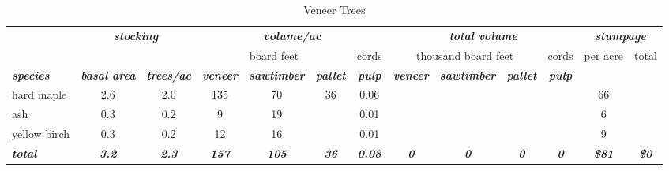 \documentclass[landscape]{article}
\begin{document}
\begin{table}[H]

\caption{\label{tab:unnamed-chunk-11}Veneer Trees}
\fontsize{10}{12}\selectfont
\begin{tabular}[t]{lcccccccccccc}
\toprule
\multicolumn{1}{c}{\em{\textbf{ }}} & \multicolumn{2}{c}{\em{\textbf{stocking}}} & \multicolumn{4}{c}{\em{\textbf{volume/ac }}} & \multicolumn{4}{c}{\em{\textbf{total volume}}} & \multicolumn{2}{c}{\em{\textbf{stumpage}}} \\
\cmidrule(l{3pt}r{3pt}){2-3} \cmidrule(l{3pt}r{3pt}){4-7} \cmidrule(l{3pt}r{3pt}){8-11} \cmidrule(l{3pt}r{3pt}){12-13}
\multicolumn{3}{c}{ } & \multicolumn{3}{c}{board feet} & \multicolumn{1}{c}{cords} & \multicolumn{3}{c}{thousand board feet} & \multicolumn{1}{c}{cords} & \multicolumn{1}{c}{per acre} & \multicolumn{1}{c}{total} \\
\cmidrule(l{3pt}r{3pt}){4-6} \cmidrule(l{3pt}r{3pt}){7-7} \cmidrule(l{3pt}r{3pt}){8-10} \cmidrule(l{3pt}r{3pt}){11-11} \cmidrule(l{3pt}r{3pt}){12-12} \cmidrule(l{3pt}r{3pt}){13-13}
\rowcolor[HTML]{DCDCDC}  \em{\textbf{species}} & \em{\textbf{basal area}} & \em{\textbf{trees/ac}} & \em{\textbf{veneer}} & \em{\textbf{sawtimber}} & \em{\textbf{pallet}} & \em{\textbf{pulp}} & \em{\textbf{veneer}} & \em{\textbf{sawtimber}} & \em{\textbf{pallet}} & \em{\textbf{pulp}} & \em{\textbf{ }} & \em{\textbf{ }}\\
\midrule
\rowcolor{gray!6}  hard maple & 2.6 & 2.0 & 135 & 70 & 36 & 0.06 &  &  &  &  & 66 & \\
 
ash & 0.3 & 0.2 & 9 & 19 &  & 0.01 &  &  &  &  & 6 & \\
 
\rowcolor{gray!6}  yellow birch & 0.3 & 0.2 & 12 & 16 &  & 0.01 &  &  &  &  & 9 & \\
 
\rowcolor[HTML]{DCDCDC}  \em{\textbf{total}} & \em{\textbf{3.2}} & \em{\textbf{2.3}} & \em{\textbf{157}} & \em{\textbf{105}} & \em{\textbf{36}} & \em{\textbf{0.08}} & \em{\textbf{0}} & \em{\textbf{0}} & \em{\textbf{0}} & \em{\textbf{0}} & \em{\textbf{\$81}} & \em{\textbf{\$0}}\\
\bottomrule
\end{tabular}
\end{table}
\end{document}
